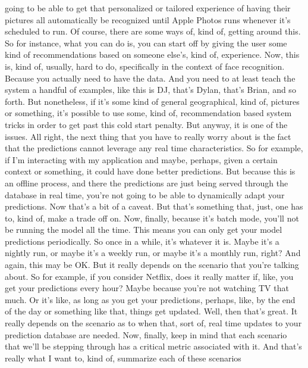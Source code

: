 {{{{{{{    going to be able to get that personalized or tailored experience
    of having their pictures all automatically
    be recognized until Apple Photos runs whenever it's scheduled to run.
    Of course, there are some ways of, kind of, getting around this.
    So for instance, what you can do is, you can start off
    by giving the user some kind of recommendations based
    on someone else's, kind of, experience.
    Now, this is, kind of, usually, hard to do, specifically
    in the context of face recognition.
    Because you actually need to have the data.
    And you need to at least teach the system
    a handful of examples, like this is DJ, that's
    Dylan, that's Brian, and so forth.
    But nonetheless, if it's some kind of general geographical,
    kind of, pictures or something, it's possible to use some, kind of,
    recommendation based system tricks in order
    to get past this cold start penalty.
    But anyway, it is one of the issues.
    All right, the next thing that you have to really worry about is the fact that
    the predictions cannot leverage any real time characteristics.
    So for example, if I'm interacting with my application and maybe,
    perhaps, given a certain context or something,
    it could have done better predictions.
    But because this is an offline process, and there the predictions are just
    being served through the database in real time,
    you're not going to be able to dynamically adapt your predictions.
    Now that's a bit of a caveat.
    But that's something that, just, one has to, kind of, make a trade off on.
    Now, finally, because it's batch mode, you'll
    not be running the model all the time.
    This means you can only get your model predictions periodically.
    So once in a while, it's whatever it is.
    Maybe it's a nightly run, or maybe it's a weekly run,
    or maybe it's a monthly run, right?
    And again, this may be OK.
    But it really depends on the scenario that you're talking about.
    So for example, if you consider Netflix, does it really
    matter if, like, you get your predictions every hour?
    Maybe because you're not watching TV that much.
    Or it's like, as long as you get your predictions, perhaps,
    like, by the end of the day or something like that, things get updated.
    Well, then that's great.
    It really depends on the scenario as to when that, sort of,
    real time updates to your prediction database are needed.
    Now, finally, keep in mind that each scenario that we'll be stepping through
    has a critical metric associated with it.
    And that's really what I want to, kind of, summarize each of these scenarios
}}}}}}}
